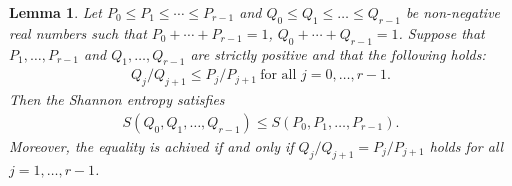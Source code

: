 \documentclass[12pt]{article}
\theoremstyle{definition}
\newtheorem{lemm}[defi]{Lemma}
\begin{document}
\begin{lemm}\label{PQ}{\it Let $P_0\leq P_1\leq \cdots \leq P_{r-1}$ and $Q_0\leq Q_1\leq \dots \leq Q_{r-1}$ be non-negative real numbers such that $P_0+\cdots +P_{r-1}=1$, $Q_0+\cdots +Q_{r-1}=1$. Suppose that $P_1,\dots, P_{r-1}$ and $Q_1,\dots, Q_{r-1}$ are strictly positive and that the following holds:
\begin{align*}
Q_j/Q_{j+1}\leq P_j/P_{j+1} \ \text{for all $j=0,\dots, r-1$.}
\end{align*}
Then the Shannon entropy satisfies 
\begin{align*}
S(Q_0, Q_1,\dots, Q_{r-1})\leq S(P_0, P_1,\dots, P_{r-1}).
\end{align*}
Moreover, the equality is achived if and only if $Q_j/Q_{j+1}=P_j/P_{j+1} $ holds for all $j=1,\dots, r-1$.
} 
\end{lemm}
\end{document}
